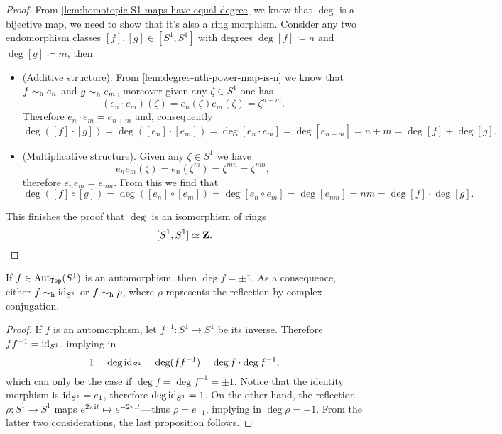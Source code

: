 \begin{proof}
From \cref{lem:homotopic-S1-maps-have-equal-degree} we know that \(\deg\) is a
bijective map, we need to show that it's also a ring morphism. Consider any two
endomorphism classes \([f], [g] \in [S^1, S^1]\) with degrees \(\deg [f]
\coloneq n\) and \(\deg [g] \coloneq m\), then:
\begin{itemize}\setlength\itemsep{0em}
\item (Additive structure). From \cref{lem:degree-nth-power-map-is-n} we know
  that \(f \sim_{\text{h}} e_n\) and \(g \sim_{\text{h}} e_m\), moreover given any
  \(\zeta \in S^1\) one has
  \[
  (e_n \cdot e_m)(\zeta) = e_n(\zeta) e_m(\zeta) = \zeta^{n + m}.
  \]
  Therefore \(e_n \cdot e_m = e_{n + m}\) and, consequently
  \[
  \deg([f] \cdot [g])
  = \deg([e_n] \cdot [e_m])
  = \deg [e_n \cdot e_m]
  = \deg [e_{n+m}]
  = n + m
  = \deg [f] + \deg [g].
  \]

\item (Multiplicative structure). Given any \(\zeta \in S^1\) we have
  \[
  e_n e_m(\zeta) = e_n(\zeta^m) = \zeta^{m n} = \zeta^{n m},
  \]
  therefore \(e_n e_m = e_{n m}\). From this we find that
  \[
  \deg([f] \circ [g])
  = \deg([e_n] \circ [e_m])
  = \deg [e_n \circ e_m]
  = \deg [e_{n m}]
  = n m
  = \deg [f] \cdot \deg [g].
  \]
\end{itemize}
This finishes the proof that \(\deg\) is an isomorphism of rings
\[
[S^1, S^1] \simeq \mathbf{Z}.
\]
\end{proof}

\begin{corollary}[Automorphisms of \(S^1\)]
\label{cor:automorphism-of-circle-is-reflection-or-identity}
If \(f \in \operatorname{Aut}_{{\texttt{Top}}}(S^1)\) is an automorphism, then \(\deg f = \pm 1\). As a
consequence, either \(f \sim_{\text{h}} \operatorname{id}_{S^1}\) or \(f \sim_{\text{h}} \rho\), where \(\rho\)
represents the reflection by complex conjugation.
\end{corollary}

\begin{proof}
If \(f\) is an automorphism, let \(f^{-1}: S^1 \to S^1\) be its
inverse. Therefore \(f f^{-1} = \operatorname{id}_{S^1}\), implying in
\[
1 = \deg \operatorname{id}_{S^1} = \deg(f f^{-1}) = \deg f \cdot \deg f^{-1},
\]
which can only be the case if \(\deg f = \deg f^{-1} = \pm 1\). Notice that the
identity morphism is \(\operatorname{id}_{S^1} = e_1\), therefore \(\deg \operatorname{id}_{S^1} = 1\). On
the other hand, the reflection \(\rho: S^1 \to S^1\) maps
\(e^{2 \pi \text{i} t} \mapsto e^{-2 \pi \text{i} t}\)---thus \(\rho = e_{-1}\),
implying in \(\deg \rho = -1\). From the latter two considerations, the last
proposition follows.
\end{proof}